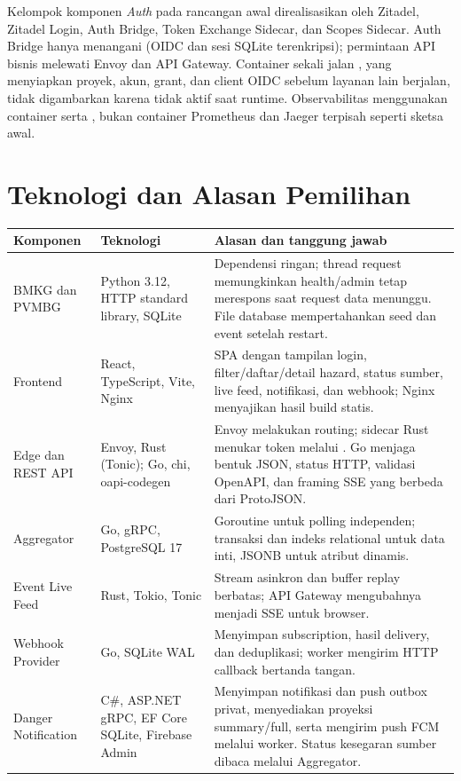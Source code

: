 Kelompok komponen \emph{Auth} pada rancangan awal direalisasikan oleh Zitadel, Zitadel Login, Auth Bridge, Token Exchange Sidecar, dan Scopes Sidecar. Auth Bridge hanya menangani  (OIDC dan sesi SQLite terenkripsi); permintaan API bisnis melewati Envoy dan API Gateway. Container sekali jalan , yang menyiapkan proyek, akun, grant, dan client OIDC sebelum layanan lain berjalan, tidak digambarkan karena tidak aktif saat runtime. Observabilitas menggunakan container  serta , bukan container Prometheus dan Jaeger terpisah seperti sketsa awal.

\section{Teknologi dan Alasan Pemilihan}
\begin{longtable}{@{}P{3cm}P{3.6cm}P{8.2cm}@{}}
\toprule \textbf{Komponen} & \textbf{Teknologi} & \textbf{Alasan dan tanggung jawab}\\\midrule\endhead
BMKG dan PVMBG & Python 3.12, HTTP standard library, SQLite & Dependensi ringan; thread request memungkinkan health/admin tetap merespons saat request data menunggu. File database mempertahankan seed dan event setelah restart.\\
Frontend & React, TypeScript, Vite, Nginx & SPA dengan tampilan login, filter/daftar/detail hazard, status sumber, live feed, notifikasi, dan webhook; Nginx menyajikan hasil build statis.\\
Edge dan REST API & Envoy, Rust (Tonic); Go, chi, oapi-codegen & Envoy melakukan routing; sidecar Rust menukar token melalui . Go menjaga bentuk JSON, status HTTP, validasi OpenAPI, dan framing SSE yang berbeda dari ProtoJSON.\\
Aggregator & Go, gRPC, PostgreSQL 17 & Goroutine untuk polling independen; transaksi dan indeks relational untuk data inti, JSONB untuk atribut dinamis.\\
Event Live Feed & Rust, Tokio, Tonic & Stream asinkron dan buffer replay berbatas; API Gateway mengubahnya menjadi SSE untuk browser.\\
Webhook Provider & Go, SQLite WAL & Menyimpan subscription, hasil delivery, dan deduplikasi; worker mengirim HTTP callback bertanda tangan.\\
Danger Notification & C\#, ASP.NET gRPC, EF Core SQLite, Firebase Admin & Menyimpan notifikasi dan push outbox privat, menyediakan proyeksi summary/full, serta mengirim push FCM melalui worker. Status kesegaran sumber dibaca melalui Aggregator.\\

\end{longtable}
